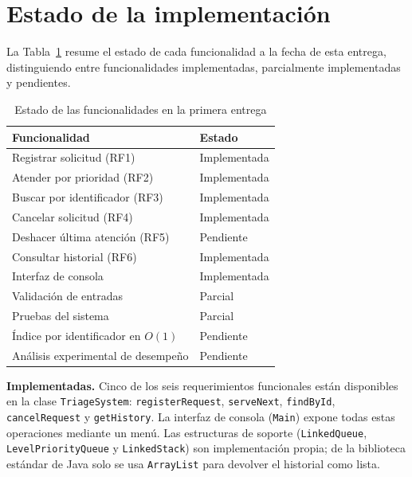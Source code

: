 \section{Estado de la implementación}
\label{sec:resultados}

La Tabla~\ref{tab:estado} resume el estado de cada funcionalidad a la
fecha de esta entrega, distinguiendo entre funcionalidades implementadas,
parcialmente implementadas y pendientes.

\begin{table}[t]
  \caption{Estado de las funcionalidades en la primera entrega}
  \label{tab:estado}
  \centering
  \begin{tabular}{p{}p{}}
    \toprule
    Funcionalidad & Estado \\
    \midrule
    Registrar solicitud (RF1) & Implementada \\
    Atender por prioridad (RF2) & Implementada \\
    Buscar por identificador (RF3) & Implementada \\
    Cancelar solicitud (RF4) & Implementada \\
    Deshacer última atención (RF5) & Pendiente \\
    Consultar historial (RF6) & Implementada \\
    Interfaz de consola & Implementada \\
    Validación de entradas & Parcial \\
    Pruebas del sistema & Parcial \\
    Índice por identificador en $O(1)$ & Pendiente \\
    Análisis experimental de desempeño & Pendiente \\
    \bottomrule
  \end{tabular}
\end{table}

\textbf{Implementadas.} Cinco de los seis requerimientos funcionales están
disponibles en la clase \texttt{TriageSystem}: \texttt{registerRequest},
\texttt{serveNext}, \texttt{findById}, \texttt{cancelRequest} y
\texttt{getHistory}. La interfaz de consola (\texttt{Main}) expone todas
estas operaciones mediante un menú. Las estructuras de soporte
(\texttt{LinkedQueue}, \texttt{LevelPriorityQueue} y \texttt{LinkedStack})
son implementación propia; de la biblioteca estándar de Java solo se usa
\texttt{ArrayList} para devolver el historial como lista.

